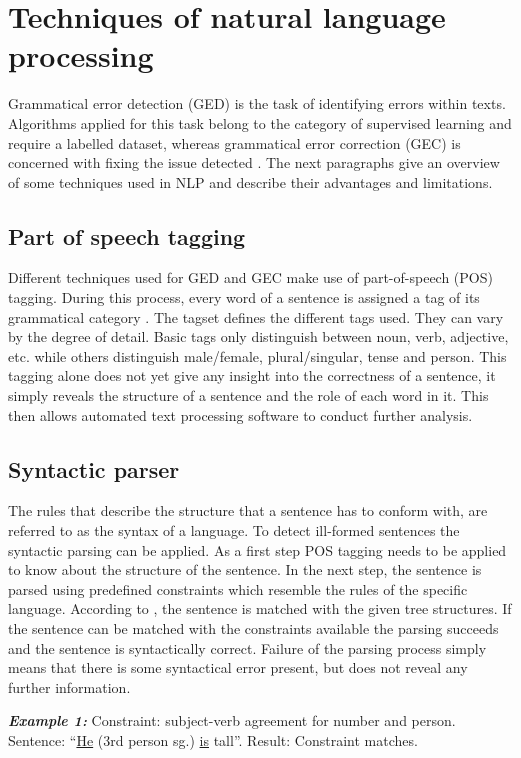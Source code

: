 \documentclass[runningheads]{llncs}
\begin{document}
\section{Techniques of natural language processing}
Grammatical error detection (GED) is the task of identifying errors within texts. Algorithms applied for this task belong to the category of supervised learning and require a labelled dataset, whereas grammatical error correction (GEC) is concerned with fixing the issue detected \citep{bell_context_2019}. The next paragraphs give an overview of some techniques used in NLP and describe their advantages and limitations.

\subsection{Part of speech tagging}
Different techniques used for GED and GEC make use of part-of-speech (POS) tagging. During this process, every word of a sentence is assigned a tag of its grammatical category \citep{noauthor_sketch_2018}. The tagset defines the different tags used. They can vary by the degree of detail. Basic tags only distinguish between noun, verb, adjective, etc. while others distinguish male/female, plural/singular, tense and person. This tagging alone does not yet give any insight into the correctness of a sentence, it simply reveals the structure of a sentence and the role of each word in it. This then allows automated text processing software to conduct further analysis.

\subsection{Syntactic parser}   
The rules that describe the structure that a sentence has to conform with, are referred to as the syntax of a language. To detect ill-formed sentences the syntactic parsing can be applied. As a first step POS tagging needs to be applied to know about the structure of the sentence. In the next step, the sentence is parsed using predefined constraints which resemble the rules of the specific language. According to \textcite{manchanda_various_2016}, the sentence is matched with the given tree structures. If the sentence can be matched with the constraints available the parsing succeeds and the sentence is syntactically correct. Failure of the parsing process simply means that there is some syntactical error present, but does not reveal any further information.

\textbf{\textit{Example 1:}} Constraint: subject-verb agreement for number and person. Sentence: ``\underline{He} (3rd person sg.) \underline{is} tall''. Result: Constraint matches.
\end{document}
